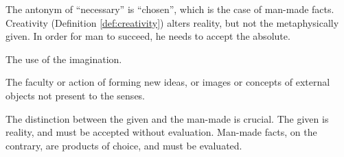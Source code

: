         The antonym of ``necessary'' is ``chosen'', which is the case of man-made facts. Creativity (Definition \ref{def:creativity}) alters reality, but not the metaphysically given. In order for man to succeed, he needs to accept the absolute.

            \begin{definition}[Creativity]
            \label{def:creativity}
                The use of the imagination.
            \end{definition}

            \begin{definition}[Imagination]
                The faculty or action of forming new ideas, or images or concepts of external objects not present to the senses.
            \end{definition}
            
        The distinction between the given and the man-made is crucial. The given is reality, and must be accepted without evaluation. Man-made facts, on the contrary, are products of choice, and must be evaluated.